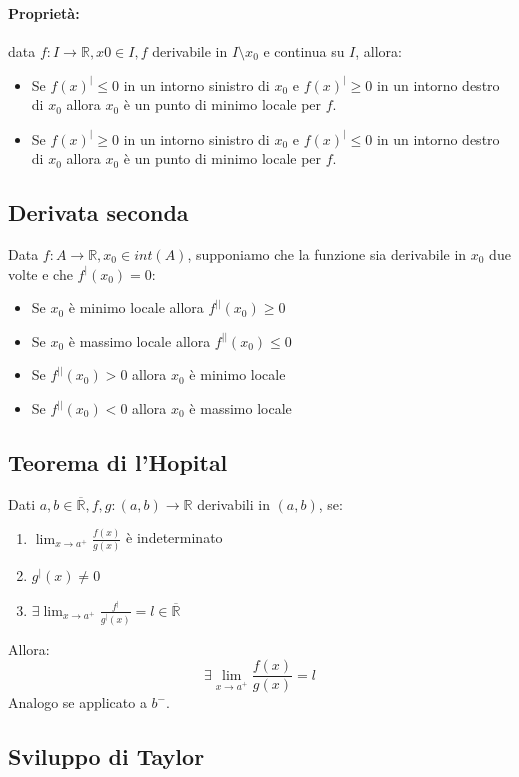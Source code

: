 \documentclass[12pt,a4paper]{article}
\begin{document}
\paragraph{Proprietà: } data $f:I \rightarrow \mathbb{R}, x0 \in I, f$ derivabile in $I \setminus {x_0}$ e continua su $I$, allora:
\begin{itemize}
  \item Se $f(x)^|\leq 0$ in un intorno sinistro di $x_0$ e $f(x)^| \geq 0$ in un intorno destro di $x_0$ allora $x_0$ è un punto di minimo locale per $f$.
  \item Se $f(x)^|\geq 0$ in un intorno sinistro di $x_0$ e $f(x)^| \leq 0$ in un intorno destro di $x_0$ allora $x_0$ è un punto di minimo locale per $f$.
\end{itemize}

\subsection{Derivata seconda}
Data $f:A \rightarrow \mathbb{R}, x_0 \in int(A)$, supponiamo che la funzione sia derivabile in $x_0$ due volte e che $f^|(x_0) = 0$:
\begin{itemize}
  \item Se $x_0$ è minimo locale allora $f^{||}(x_0) \geq 0$
  \item Se $x_0$ è massimo locale allora $f^{||}(x_0) \leq 0$
  \item Se $f^{||}(x_0) > 0$ allora $x_0$ è minimo locale
  \item Se $f^{||}(x_0) < 0$ allora $x_0$ è massimo locale
\end{itemize}

\subsection{Teorema di l'Hopital}
Dati $a,b \in \overline{\mathbb{R}}, f,g: (a,b) \rightarrow \mathbb{R}$ derivabili in $(a,b)$, se:
\begin{enumerate}
  \item $\lim_{x \to a^+} \frac{f(x)}{g(x)}$ è indeterminato
  \item $g^|(x) \ne 0$
  \item $\exists \lim_{x \to a^+} \frac{f^|}{g^|(x)} = l \in \overline{\mathbb{R}}$
\end{enumerate}
Allora:
\[
\exists \lim_{x \to a^+} \frac{f(x)}{g(x)} = l
\]
Analogo se applicato a $b^-$.

\subsection{Sviluppo di Taylor}
\end{document}
